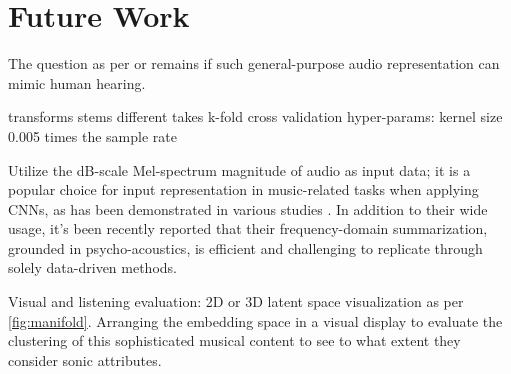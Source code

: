 \chapter{Future Work}

The question as per \cite{Turian2022HEAR:Representations} or \cite{Li2023MERT:Training} remains if such general-purpose audio representation can mimic human hearing.

transforms
stems
different takes
k-fold cross validation
hyper-params: kernel size 0.005 times the sample rate

Utilize the dB-scale Mel-spectrum magnitude of audio as input data; it is a popular choice for input representation in music-related tasks when applying CNNs, as has been demonstrated in various studies \cite{Kim2020OneStrategies}. In addition to their wide usage, it's been recently reported that their frequency-domain summarization, grounded in psycho-acoustics, is efficient and challenging to replicate through solely data-driven methods. \cite{Kim2020OneStrategies}

Visual and listening evaluation: 2D or 3D latent space visualization as per \ref{fig:manifold}. Arranging the embedding space in a visual display to evaluate the clustering of this sophisticated musical content to see to what extent they consider sonic attributes. 



\newpage
